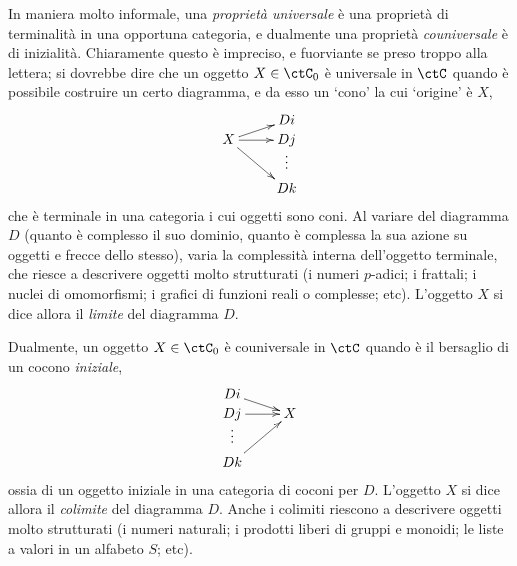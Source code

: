 In maniera molto informale, una \emph{proprietà universale} è una proprietà di terminalità in una opportuna categoria, e dualmente una proprietà \emph{couniversale} è di inizialità. Chiaramente questo è impreciso, e fuorviante se preso troppo alla lettera; si dovrebbe dire che un oggetto $X\in\ctC_0$ è universale in $\ctC$ quando è possibile costruire un certo diagramma, e da esso un `cono' la cui `origine' è $X$, 
\[\xymatrix@R=0mm{
 & Di \\
X \ar@{->}[ru] \ar@{->}[r] \ar@{->}[rdd] & Dj \\
 & \vdots \\
 & Dk
}\]
che è terminale in una categoria i cui oggetti sono coni. Al variare del diagramma $D$ (quanto è complesso il suo dominio, quanto è complessa la sua azione su oggetti e frecce dello stesso), varia la complessità interna dell'oggetto terminale, che riesce a descrivere oggetti molto strutturati (i numeri $p$-adici; i frattali; i nuclei di omomorfismi; i grafici di funzioni reali o complesse; etc). L'oggetto $X$ si dice allora il \emph{limite} del diagramma $D$.

Dualmente, un oggetto $X\in\ctC_0$ è couniversale in $\ctC$ quando è il bersaglio di un cocono \emph{iniziale}, 
\[\xymatrix@R=0mm{
Di \ar@{->}[rd] &  \\
Dj \ar@{->}[r] & X \\
\vdots &  \\
Dk \ar@{->}[ruu] & 
}\] 
ossia di un oggetto iniziale in una categoria di coconi per $D$. L'oggetto $X$ si dice allora il \emph{colimite} del diagramma $D$. Anche i colimiti riescono a descrivere oggetti molto strutturati (i numeri naturali; i prodotti liberi di gruppi e monoidi; le liste a valori in un alfabeto $S$; etc).

